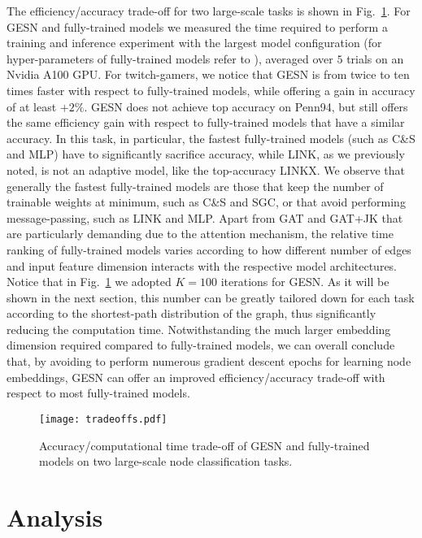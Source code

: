 \documentclass[final,5p,times,twocolumn]{elsarticle}
\begin{document}
The efficiency/accuracy trade-off for two large-scale tasks is shown in Fig.~\ref{fig:efficiencty}.
For GESN and fully-trained models we measured the time required to perform a training and inference experiment with the largest model configuration (for hyper-parameters of fully-trained models refer to \cite{Lim2021}), averaged over $5$ trials on an Nvidia A100 GPU.
For twitch-gamers, we notice that GESN is from twice to ten times faster with respect to fully-trained models, while offering a gain in accuracy of at least $+2\%$.
GESN does not achieve top accuracy on Penn94, but still offers the same efficiency gain with respect to fully-trained models that have a similar accuracy.
In this task, in particular, the fastest fully-trained models (such as C\&S and MLP) have to significantly sacrifice accuracy, while LINK, as we previously noted, is not an adaptive model, like the top-accuracy LINKX.
We observe that generally the fastest fully-trained models are those that keep the number of trainable weights at minimum, such as C\&S and SGC, or that avoid performing message-passing, such as LINK and MLP.
Apart from GAT and GAT+JK that are particularly demanding due to the attention mechanism, the relative time ranking of fully-trained models varies according to how different number of edges and input feature dimension interacts with the respective model architectures.
Notice that in Fig.~\ref{fig:efficiencty} we adopted $K=100$ iterations for GESN.
As it will be shown in the next section, this number can be greatly tailored down for each task according to the shortest-path distribution of the graph, thus significantly reducing the computation time.
Notwithstanding the much larger embedding dimension required compared to fully-trained models, we can overall conclude that, by avoiding to perform numerous gradient descent epochs for learning node embeddings, GESN can offer an improved efficiency/accuracy trade-off with respect to most fully-trained models.

\begin{figure}\centering
	\texttt{[image: tradeoffs.pdf]}
	\caption{Accuracy/computational time trade-off of GESN and fully-trained models on two large-scale node classification tasks.}
	\label{fig:efficiencty}
\end{figure}

\section{Analysis}
\label{sec:analysis}
\end{document}
